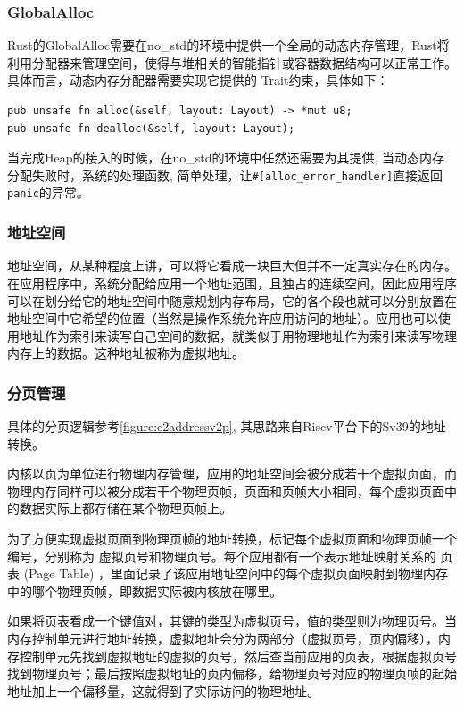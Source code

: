 \subsubsection{GlobalAlloc}
Rust的GlobalAlloc需要在no\_std的环境中提供一个全局的动态内存管理，Rust将利用分配器来管理空间，使得与堆相关的智能指针或容器数据结构可以正常工作。具体而言，动态内存分配器需要实现它提供的 Trait约束，具体如下：

\begin{lstlisting}[caption=GlobalAlloc的Trait约束]
pub unsafe fn alloc(&self, layout: Layout) -> *mut u8;
pub unsafe fn dealloc(&self, layout: Layout);
\end{lstlisting}

当完成Heap的接入的时候，在no\_std的环境中任然还需要为其提供, 当动态内存分配失败时，系统的处理函数, 简单处理，让\verb|#[alloc_error_handler]|直接返回\verb|panic|的异常。

\subsubsection{地址空间}

地址空间，从某种程度上讲，可以将它看成一块巨大但并不一定真实存在的内存。在应用程序中，系统分配给应用一个地址范围，且独占的连续空间，因此应用程序可以在划分给它的地址空间中随意规划内存布局，它的各个段也就可以分别放置在地址空间中它希望的位置（当然是操作系统允许应用访问的地址）。应用也可以使用地址作为索引来读写自己空间的数据，就类似于用物理地址作为索引来读写物理内存上的数据。这种地址被称为虚拟地址。


\subsubsection{分页管理}

具体的分页逻辑参考\autoref{figure:c2addressv2p}, 其思路来自Riscv平台下的Sv39的地址转换。

内核以页为单位进行物理内存管理，应用的地址空间会被分成若干个虚拟页面，而物理内存同样可以被分成若干个物理页帧，页面和页帧大小相同，每个虚拟页面中的数据实际上都存储在某个物理页帧上。

为了方便实现虚拟页面到物理页帧的地址转换，标记每个虚拟页面和物理页帧一个编号，分别称为 虚拟页号和物理页号。每个应用都有一个表示地址映射关系的 页表 (Page Table) ，里面记录了该应用地址空间中的每个虚拟页面映射到物理内存中的哪个物理页帧，即数据实际被内核放在哪里。

如果将页表看成一个键值对，其键的类型为虚拟页号，值的类型则为物理页号。当内存控制单元进行地址转换，虚拟地址会分为两部分（虚拟页号，页内偏移），内存控制单元先找到虚拟地址的虚拟的页号，然后查当前应用的页表，根据虚拟页号找到物理页号；最后按照虚拟地址的页内偏移，给物理页号对应的物理页帧的起始地址加上一个偏移量，这就得到了实际访问的物理地址。

